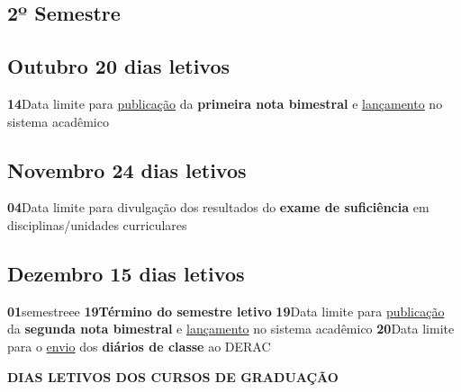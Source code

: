 \documentclass[thesis]{hmcposter}
\begin{document}
\begin{poster}
\section{\hfill \color{hmcorange}2º Semestre}
\subsection{Outubro \hfill 20 dias letivos}\textbf{14}\qquad Data limite para \underline{publicação} da \textbf{primeira nota bimestral} e \underline{lançamento} no sistema acadêmico \newline \null\subsection{Novembro \hfill 24 dias letivos}\textbf{04}\qquad Data limite para divulgação dos resultados do \textbf{exame de suficiência} em disciplinas/unidades curriculares \newline \null\subsection{Dezembro \hfill 15 dias letivos}\textbf{01}\qquad semestreee \newline \null\textbf{19}\qquad \textbf{Término do semestre letivo} \newline \null\textbf{19}\qquad Data limite para \underline{publicação} da \textbf{segunda nota bimestral} e \underline{lançamento} no sistema acadêmico \newline \null\textbf{20}\qquad Data limite para o \underline{envio} dos \textbf{diários de classe} ao DERAC \newline \null\newpage
~
\vfill
\begin{center}
\large \textbf{DIAS LETIVOS DOS CURSOS DE GRADUAÇÃO}
\newline
\null
\newline
\begin{table}
\centering
{}
\end{table}
\end{center}
\end{poster}
\end{document}
